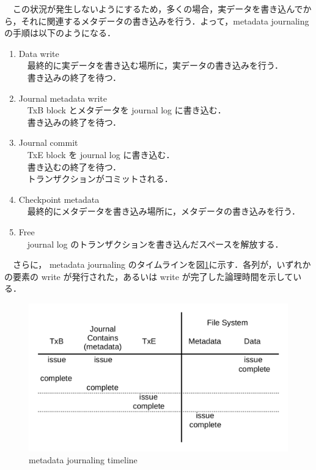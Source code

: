 \documentclass[graduation-thesis]{jsarticle}
\begin{document}
　この状況が発生しないようにするため，多くの場合，実データを書き込んでから，それに関連するメタデータの書き込みを行う．よって，metadata journaling の手順は以下のようになる．\\
\begin{enumerate}
	\item{Data write}\\
	　最終的に実データを書き込む場所に，実データの書き込みを行う．\\
	　書き込みの終了を待つ．
	\item{Journal metadata write}\\
	　TxB block とメタデータを journal log に書き込む．\\
	　書き込みの終了を待つ．
	\item{Journal commit}\\
	　TxE block を journal log に書き込む．\\
	　書き込むの終了を待つ．\\
	　トランザクションがコミットされる．
	\item{Checkpoint metadata}\\
	　最終的にメタデータを書き込み場所に，メタデータの書き込みを行う．\\
	\item{Free}\\
	　journal log のトランザクションを書き込んだスペースを解放する．\\
\end{enumerate}
　さらに， metadata journaling のタイムラインを図\ref{fig:timeline}に示す．各列が，いずれかの要素の write が発行された，あるいは write が完了した論理時間を示している．\\
\begin{figure}
	\begin{center}
		\includegraphics[width=13.0cm,clip]{images/timeline.pdf}
		\caption{metadata journaling timeline}
		\label{fig:timeline}
	\end{center}
\end{figure}
\end{document}
